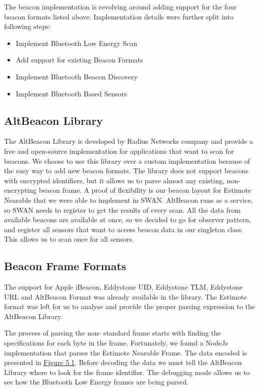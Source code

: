 The beacon implementation is revolving around adding support for the four beacon formats listed above. Implementation details were further split into 
following steps:
\begin{itemize}
 \item Implement Bluetooth Low Energy Scan
 \item Add support for existing Beacon Formats
 \item Implement Bluetooth Beacon Discovery
 \item Implement Bluetooth Based Sensors
\end{itemize}

\subsection{AltBeacon Library}
The AltBeacon Library is developed by Radius Networks\cite{radius_networks} company and provide a free and open-source implementation for applications that want to scan for beacons.
We choose to use this library over a custom implementation because of the easy way to add new beacon formats. The library does not support beacons with encrypted 
identifiers, but it allows us to parse almost any existing, non-encrypting beacon frame. A proof of flexibility is our beacon layout for Estimote Nearable that we were able to 
implement in SWAN.
AltBeacon runs as a service, so SWAN needs to register to get the results of every scan. All the data from available beacons are available at once, so we decided to go for observer 
pattern, and register all sensors that want to access beacon data in our singleton class. This allows us to scan once for all sensors.

\subsection{Beacon Frame Formats}
The support for Apple iBeacon, Eddystone UID, Eddystone TLM, Eddystone URL and AltBeacon Format was already available in the library.
The Estimote format was left for us to analyse and provide the proper parsing expression to the AltBeacon Library.

The process of parsing the non- standard frame starts with finding the specifications for each byte in the frame. Fortunately, we found a NodeJs implementation 
that parses the Estimote Nearable Frame. The data encoded is presented in \hyperref[fig:estimote_format]{Figure 5.1}.
Before decoding the data we must tell the AltBeacon Library where to look for the frame identifier. The debugging mode allows us to see how the Bluetooth Low Energy frames are being parsed.

